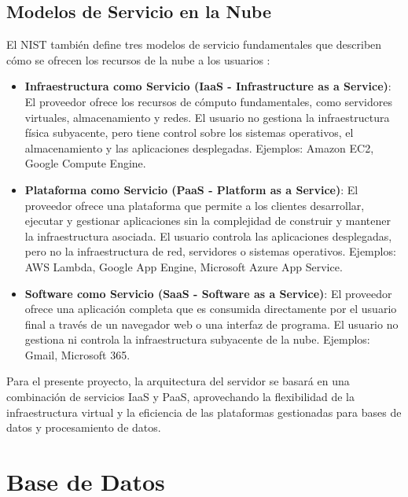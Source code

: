 \subsection{Modelos de Servicio en la Nube}
\label{subsec:modelos_servicio_nube}

El NIST también define tres modelos de servicio fundamentales que describen cómo se ofrecen los recursos de la nube a los usuarios \cite{mell2011nist}:

\begin{itemize}
    \item \textbf{Infraestructura como Servicio (IaaS - Infrastructure as a Service)}: El proveedor ofrece los recursos de cómputo fundamentales, como servidores virtuales, almacenamiento y redes. El usuario no gestiona la infraestructura física subyacente, pero tiene control sobre los sistemas operativos, el almacenamiento y las aplicaciones desplegadas. Ejemplos: Amazon EC2, Google Compute Engine.

    \item \textbf{Plataforma como Servicio (PaaS - Platform as a Service)}: El proveedor ofrece una plataforma que permite a los clientes desarrollar, ejecutar y gestionar aplicaciones sin la complejidad de construir y mantener la infraestructura asociada. El usuario controla las aplicaciones desplegadas, pero no la infraestructura de red, servidores o sistemas operativos. Ejemplos: AWS Lambda, Google App Engine, Microsoft Azure App Service.

    \item \textbf{Software como Servicio (SaaS - Software as a Service)}: El proveedor ofrece una aplicación completa que es consumida directamente por el usuario final a través de un navegador web o una interfaz de programa. El usuario no gestiona ni controla la infraestructura subyacente de la nube. Ejemplos: Gmail, Microsoft 365.
\end{itemize}

Para el presente proyecto, la arquitectura del servidor se basará en una combinación de servicios IaaS y PaaS, aprovechando la flexibilidad de la infraestructura virtual y la eficiencia de las plataformas gestionadas para bases de datos y procesamiento de datos.



\section{Base de Datos}
\label{sec:base_de_datos}

